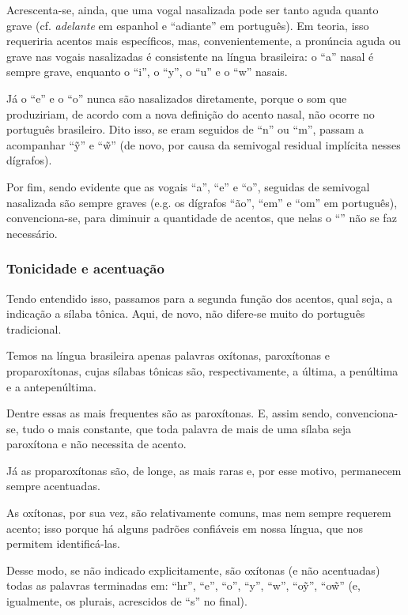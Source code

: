 \documentclass[12pt, a5paper, titlepage]{article}
\begin{document}
\begin{bilingualpages}
    Acrescenta-se, ainda, que uma vogal nasalizada pode ser tanto aguda quanto
    grave (cf. \textit{adelante} em espanhol e ``adiante'' em português). Em
    teoria, isso requeriria acentos mais específicos, mas, convenientemente, a
    pronúncia aguda ou grave nas vogais nasalizadas é consistente na língua
    brasileira: o ``a'' nasal é sempre grave, enquanto o ``i'', o ``y'', o ``u'' e o ``w'' nasais.

    Já o ``e'' e o ``o'' nunca são
    nasalizados diretamente, porque o som que produziriam, de acordo com a nova
    definição do acento nasal, não ocorre no português brasileiro. Dito isso, se eram seguidos de ``n'' ou ``m'', passam a acompanhar ``\~y'' e ``\~w''
    (de novo, por causa da semivogal residual implícita nesses dígrafos).

    Por fim, sendo evidente que as vogais ``a'', ``e'' e ``o'', seguidas de semivogal nasalizada são sempre graves (e.g. os dígrafos ``ão'', ``em'' e ``om'' em português), convenciona-se, para diminuir a quantidade de acentos, que nelas o ``\textasciigrave'' não se faz necessário.

    \subsubsection{Tonicidade e acentuação}
    Tendo entendido isso, passamos para a segunda função dos acentos, qual seja, a indicação a sílaba tônica. Aqui, de novo, não difere-se muito do português tradicional.

    Temos na língua brasileira apenas palavras oxítonas, paroxítonas e proparoxítonas, cujas sílabas tônicas são, respectivamente, a última, a penúltima e a antepenúltima.

    Dentre essas as mais frequentes são as paroxítonas. E, assim sendo, convenciona-se, tudo o mais constante, que toda palavra de mais de uma sílaba seja paroxítona e não necessita de acento.

    Já as proparoxítonas são, de longe, as mais raras e, por esse motivo, permanecem sempre acentuadas.

    As oxítonas, por sua vez, são relativamente comuns, mas nem sempre requerem acento; isso porque há alguns padrões confiáveis em nossa língua, que nos permitem identificá-las.

    Desse modo, se não indicado explicitamente, são oxítonas (e não acentuadas) todas as palavras terminadas em: ``hr'', ``e'', ``o'', ``y'', ``w'', ``o\~y'', ``o\~w'' (e, igualmente, os plurais, acrescidos de ``s'' no final).


\end{bilingualpages}
\end{document}
